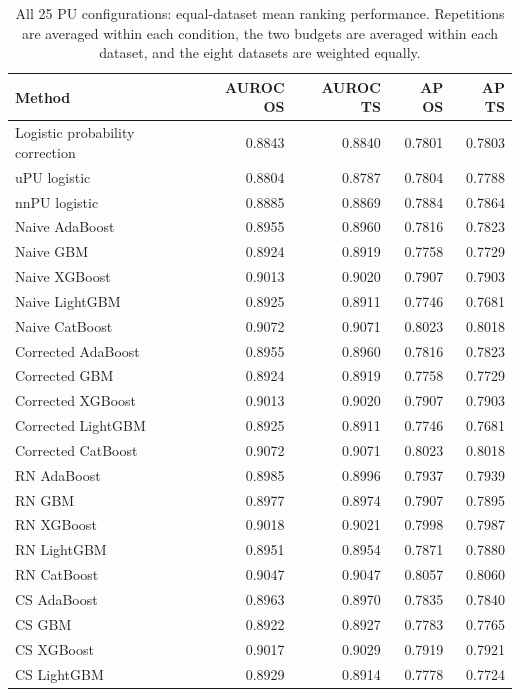 \begin{table}[t]
\centering
\caption{All 25 PU configurations: equal-dataset mean ranking performance. Repetitions are averaged within each condition, the two budgets are averaged within each dataset, and the eight datasets are weighted equally.}
\label{tab:s-real-all-methods-equal-dataset}
\small
\setlength{\tabcolsep}{3.5pt}
\renewcommand{\arraystretch}{1.08}
\begin{tabularx}{\textwidth}{>{\raggedright\arraybackslash}Xrrrr}
\toprule
Method & AUROC OS & AUROC TS & AP OS & AP TS \\
\midrule
Logistic probability correction & 0.8843 & 0.8840 & 0.7801 & 0.7803 \\
uPU logistic & 0.8804 & 0.8787 & 0.7804 & 0.7788 \\
nnPU logistic & 0.8885 & 0.8869 & 0.7884 & 0.7864 \\
Naive AdaBoost & 0.8955 & 0.8960 & 0.7816 & 0.7823 \\
Naive GBM & 0.8924 & 0.8919 & 0.7758 & 0.7729 \\
Naive XGBoost & 0.9013 & 0.9020 & 0.7907 & 0.7903 \\
Naive LightGBM & 0.8925 & 0.8911 & 0.7746 & 0.7681 \\
Naive CatBoost & 0.9072 & 0.9071 & 0.8023 & 0.8018 \\
Corrected AdaBoost & 0.8955 & 0.8960 & 0.7816 & 0.7823 \\
Corrected GBM & 0.8924 & 0.8919 & 0.7758 & 0.7729 \\
Corrected XGBoost & 0.9013 & 0.9020 & 0.7907 & 0.7903 \\
Corrected LightGBM & 0.8925 & 0.8911 & 0.7746 & 0.7681 \\
Corrected CatBoost & 0.9072 & 0.9071 & 0.8023 & 0.8018 \\
RN AdaBoost & 0.8985 & 0.8996 & 0.7937 & 0.7939 \\
RN GBM & 0.8977 & 0.8974 & 0.7907 & 0.7895 \\
RN XGBoost & 0.9018 & 0.9021 & 0.7998 & 0.7987 \\
RN LightGBM & 0.8951 & 0.8954 & 0.7871 & 0.7880 \\
RN CatBoost & 0.9047 & 0.9047 & 0.8057 & 0.8060 \\
CS AdaBoost & 0.8963 & 0.8970 & 0.7835 & 0.7840 \\
CS GBM & 0.8922 & 0.8927 & 0.7783 & 0.7765 \\
CS XGBoost & 0.9017 & 0.9029 & 0.7919 & 0.7921 \\
CS LightGBM & 0.8929 & 0.8914 & 0.7778 & 0.7724 \\

\end{tabularx}
\end{table}
